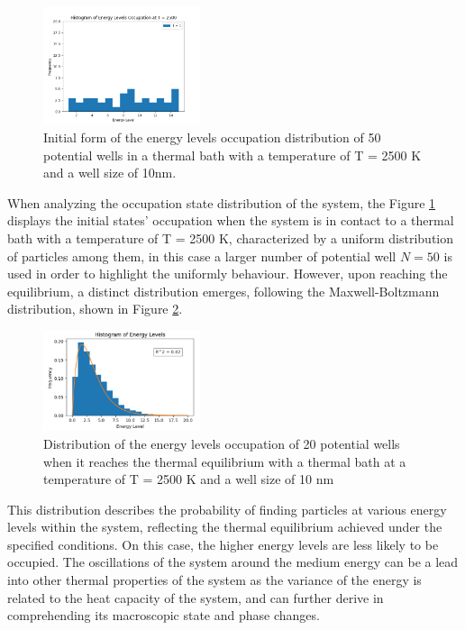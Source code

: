 \documentclass[%
 reprint,
 amsmath,amssymb,
 aps,
]{revtex4-2}
\begin{document}
\begin{figure}[h!]
    \centering \includegraphics[width=0.41\textwidth]{Dist0.png} 
    \caption{Initial form of the energy levels occupation distribution of 50 potential wells in a thermal bath with a temperature of T = 2500 K and a well size of 10nm.}
    \label{fig:dist0}
\end{figure}

When analyzing the occupation state distribution of the system, the Figure \ref{fig:dist0} displays the initial states' occupation when the system is in contact to a thermal bath with a temperature of T = 2500 K, characterized by a uniform distribution of particles among them, in this case a larger number of potential well $N = 50$ is used in order to highlight the uniformly behaviour. However, upon reaching the equilibrium, a distinct distribution emerges, following the Maxwell-Boltzmann distribution, shown in Figure \ref{fig:distfin}. 
\begin{figure}[h]
    \centering \includegraphics[width=0.41\textwidth]{ultimo.png}
    \caption{Distribution of the energy levels occupation of 20 potential wells when it reaches the thermal equilibrium with a thermal bath at a temperature of T = 2500 K and a well size of 10 nm}
    \label{fig:distfin}
\end{figure}
\par
This distribution describes the probability of finding particles at various energy levels within the system, reflecting the thermal equilibrium achieved under the specified conditions. On this case, the higher energy levels are less likely to be occupied. 
The oscillations of the system around the medium energy can be a lead into other thermal properties of the system as the variance of the energy is related to the heat capacity of the system, and can further derive in comprehending its macroscopic state and phase changes.
\end{document}
